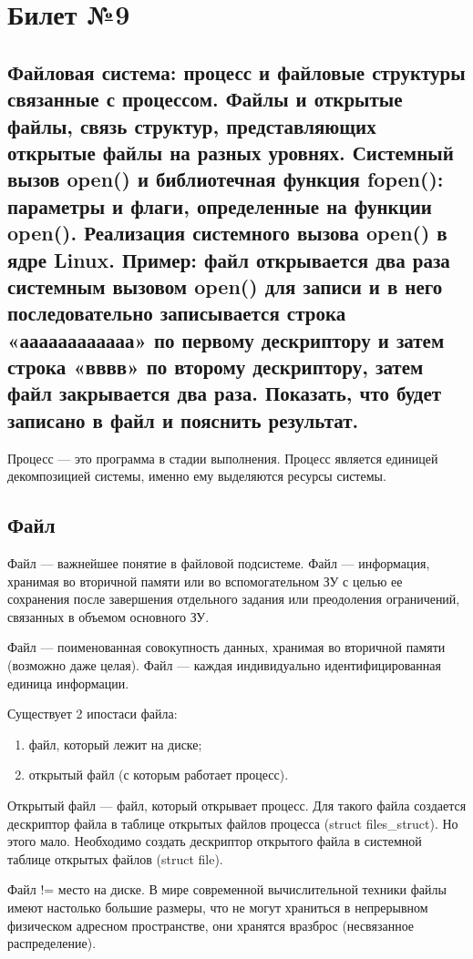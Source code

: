 \chapter{Билет №9}

\section*{Файловая система: процесс и файловые структуры связанные с процессом. Файлы и открытые файлы, связь структур, представляющих открытые файлы на разных уровнях. Системный вызов open() и библиотечная функция fopen(): параметры и флаги, определенные на функции open(). Реализация системного вызова open() в ядре Linux. Пример: файл открывается два раза системным вызовом open() для записи и в него последовательно записывается строка \\ «аааааааааааа» по первому дескриптору и затем строка «вввв» по второму дескриптору, затем файл закрывается два раза. Показать, что будет записано в файл и пояснить результат.}

Процесс — это программа в стадии выполнения.
Процесс является единицей декомпозицией системы, именно ему выделяются ресурсы системы.

\section{Файл}
Файл --- важнейшее понятие в файловой подсистеме. Файл --- информация, хранимая во вторичной памяти или во вспомогательном ЗУ с целью ее сохранения после завершения отдельного задания или преодоления ограничений, связанных в объемом основного ЗУ.

Файл --- поименованная совокупность данных, хранимая во вторичной памяти (возможно даже целая). Файл --- каждая индивидуально идентифицированная единица информации.

Существует 2 ипостаси файла:
\begin{enumerate}
	\item файл, который лежит на диске;
	\item открытый файл (с которым работает процесс).
\end{enumerate}

Открытый файл — файл, который открывает процесс. Для такого файла создается дескриптор файла в таблице открытых файлов процесса (struct files\_struct). Но этого мало. Необходимо создать дескриптор открытого файла в системной таблице открытых файлов (struct file).

Файл != место на диске. В мире современной вычислительной техники файлы имеют настолько большие размеры, что не могут храниться в непрерывном физическом адресном пространстве, они хранятся вразброс (несвязанное распределение).

